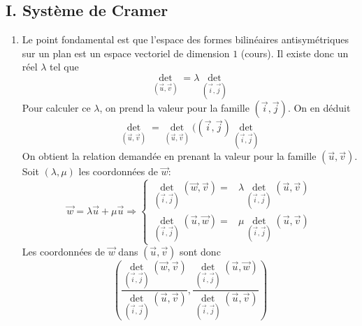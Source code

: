 \subsection*{I. Système de Cramer}
\begin{enumerate}
 \item Le point fondamental est que l'espace des formes bilinéaires antisymétriques sur un plan est un espace vectoriel de dimension $1$ (cours). Il existe donc un réel $\lambda$ tel que 
 \begin{displaymath}
   \det_{(\overrightarrow{u},\overrightarrow{v})} = \lambda \det_{(\overrightarrow{i},\overrightarrow{j})}
 \end{displaymath}
Pour calculer ce $\lambda$, on prend la valeur pour la famille  $(\overrightarrow{i},\overrightarrow{j})$. On en déduit
\begin{displaymath}
  \det_{(\overrightarrow{u},\overrightarrow{v})} = 
  \det_{(\overrightarrow{u},\overrightarrow{v})}((\overrightarrow{i},\overrightarrow{j})
  \det_{(\overrightarrow{i},\overrightarrow{j})}
\end{displaymath}
On obtient la relation demandée en prenant la valeur pour la famille $(\overrightarrow{u},\overrightarrow{v})$.\newline
Soit $(\lambda, \mu)$ les coordonnées de $\overrightarrow{w}$:
\begin{displaymath}
  \overrightarrow{w}= \lambda \overrightarrow{u} + \mu \overrightarrow{u}
  \Rightarrow
\left\lbrace  
\begin{aligned}
  \det_{(\overrightarrow{i},\overrightarrow{j})}(\overrightarrow{w},\overrightarrow{v})=&
  \lambda \det_{(\overrightarrow{i},\overrightarrow{j})}(\overrightarrow{u},\overrightarrow{v})\\
  \det_{(\overrightarrow{i},\overrightarrow{j})}(\overrightarrow{u},\overrightarrow{w})=&
  \mu \det_{(\overrightarrow{i},\overrightarrow{j})}(\overrightarrow{u},\overrightarrow{v})
\end{aligned}
\right. 
\end{displaymath}
Les coordonnées de $\overrightarrow{w}$ dans $(\overrightarrow{u},\overrightarrow{v})$ sont donc
\begin{displaymath}
  \left( \frac{\det_{(\overrightarrow{i},\overrightarrow{j})}(\overrightarrow{w},\overrightarrow{v})}
              {\det_{(\overrightarrow{i},\overrightarrow{j})}(\overrightarrow{u},\overrightarrow{v})},
         \frac{\det_{(\overrightarrow{i},\overrightarrow{j})}(\overrightarrow{u},\overrightarrow{w})}
              {\det_{(\overrightarrow{i},\overrightarrow{j})}(\overrightarrow{u},\overrightarrow{v})}
  \right) 
\end{displaymath}


\end{enumerate}
